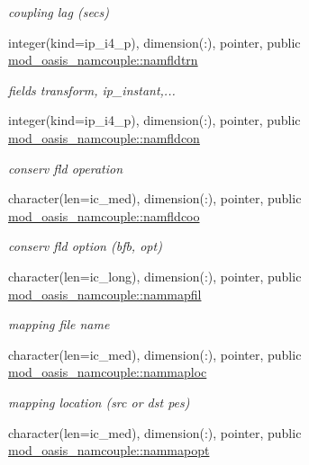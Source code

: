 \begin{DoxyCompactItemize}
\begin{DoxyCompactList}\small\item\em coupling lag (secs) \end{DoxyCompactList}\item 
integer(kind=ip\+\_\+i4\+\_\+p), dimension(\+:), pointer, public \hyperlink{namespacemod__oasis__namcouple_a5f81bc00e6dc045770edd4093f68278c}{mod\+\_\+oasis\+\_\+namcouple\+::namfldtrn}
\begin{DoxyCompactList}\small\item\em fields transform, ip\+\_\+instant,... \end{DoxyCompactList}\item 
integer(kind=ip\+\_\+i4\+\_\+p), dimension(\+:), pointer, public \hyperlink{namespacemod__oasis__namcouple_a96aa6a31ef021468f807819a84b327c3}{mod\+\_\+oasis\+\_\+namcouple\+::namfldcon}
\begin{DoxyCompactList}\small\item\em conserv fld operation \end{DoxyCompactList}\item 
character(len=ic\+\_\+med), dimension(\+:), pointer, public \hyperlink{namespacemod__oasis__namcouple_a119b86702766d5392cb44856448bcd3e}{mod\+\_\+oasis\+\_\+namcouple\+::namfldcoo}
\begin{DoxyCompactList}\small\item\em conserv fld option (bfb, opt) \end{DoxyCompactList}\item 
character(len=ic\+\_\+long), dimension(\+:), pointer, public \hyperlink{namespacemod__oasis__namcouple_a9fc6ac674a8cfa68d9d15ad13213e21d}{mod\+\_\+oasis\+\_\+namcouple\+::nammapfil}
\begin{DoxyCompactList}\small\item\em mapping file name \end{DoxyCompactList}\item 
character(len=ic\+\_\+med), dimension(\+:), pointer, public \hyperlink{namespacemod__oasis__namcouple_a7316d7d322da7cf10f315e38c145ebbb}{mod\+\_\+oasis\+\_\+namcouple\+::nammaploc}
\begin{DoxyCompactList}\small\item\em mapping location (src or dst pes) \end{DoxyCompactList}\item 
character(len=ic\+\_\+med), dimension(\+:), pointer, public \hyperlink{namespacemod__oasis__namcouple_ad2554b4881fa63780dd5e6fe78d705ef}{mod\+\_\+oasis\+\_\+namcouple\+::nammapopt}

\end{DoxyCompactItemize}
